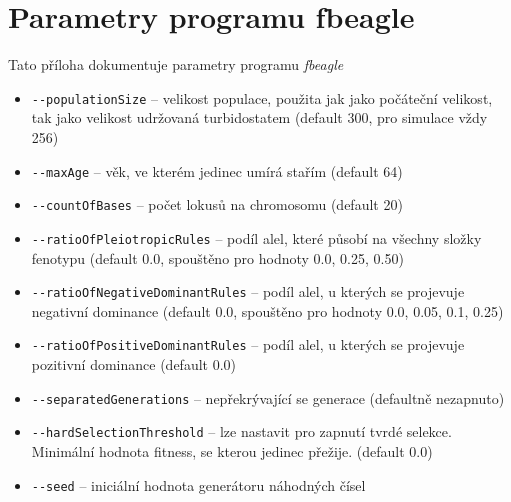 \section{Parametry programu fbeagle}
\label{sec:parameters}

Tato příloha dokumentuje parametry programu \textit{fbeagle}

\begin{itemize}
  \item \texttt{-{}-populationSize} -- velikost populace, použita jak jako počáteční velikost, tak jako velikost udržovaná turbidostatem (default 300, pro simulace vždy 256)
  \item \texttt{-{}-maxAge} -- věk, ve kterém jedinec umírá stařím (default 64)
  \item \texttt{-{}-countOfBases} -- počet lokusů na chromosomu (default 20)
  \item \texttt{-{}-ratioOfPleiotropicRules} -- podíl alel, které působí na všechny složky fenotypu (default 0.0, spouštěno pro hodnoty 0.0, 0.25, 0.50)
  \item \texttt{-{}-ratioOfNegativeDominantRules} -- podíl alel, u kterých se projevuje negativní dominance (default 0.0, spouštěno pro hodnoty 0.0, 0.05, 0.1, 0.25)
  \item \texttt{-{}-ratioOfPositiveDominantRules} -- podíl alel, u kterých se projevuje pozitivní dominance (default 0.0)
  \item \texttt{-{}-separatedGenerations} -- nepřekrývající se generace (defaultně nezapnuto)
  \item \texttt{-{}-hardSelectionThreshold} -- lze nastavit pro zapnutí tvrdé selekce. Minimální hodnota fitness, se kterou jedinec přežije. (default 0.0)
  \item \texttt{-{}-seed} -- iniciální hodnota generátoru náhodných čísel
\end{itemize}
